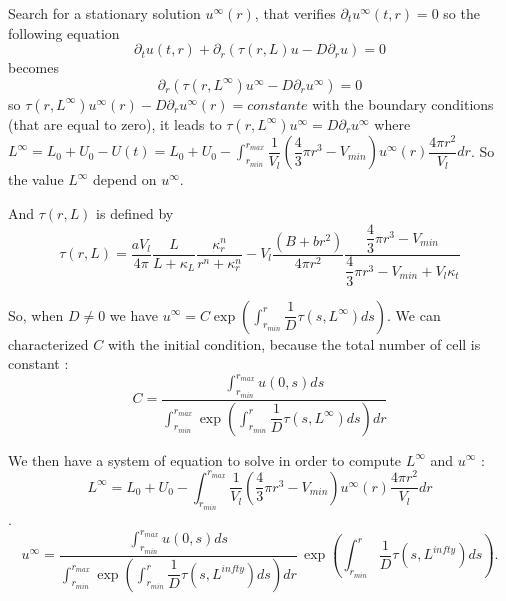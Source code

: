 \documentclass[11pt,a4paper]{article}
\begin{document}
Search for a stationary solution $u^{\infty}(r)$, that verifies $\partial_t u^{\infty}(t, r) = 0$ so the following equation
$$\partial_t u(t, r) + \partial_r( \tau(r, L) u - D \partial_r u) = 0$$
becomes 
$$\partial_r( \tau(r, L^{\infty}) u^{\infty} - D \partial_r u^{\infty}) = 0$$
so $\tau(r, L^{\infty}) u^{\infty}(r) - D \partial_r u^{\infty}(r) = constante$
with the boundary conditions (that are equal to zero), it leads to $\tau(r, L^{\infty}) u^{\infty} = D \partial_r u^{\infty}$
where $L^{\infty} = L_0 + U_0 - U(t) = L_0 + U_0 - \int_{r_{min}}^{r_{max}} \dfrac{1}{V_l}(\dfrac{4}{3} \pi r^3 - V_{min})u^{\infty}(r) \dfrac{4\pi r^ 2}{V_l} dr$.
So the value $L^{\infty}$ depend on $u^{\infty}$.

And $\tau(r, L)$ is defined by 
$$ \tau(r, L) = \dfrac{aV_l}{4\pi}  \dfrac{L}{L + \kappa_L} \dfrac{\kappa_r^n}{r^n+\kappa_r^n} - V_l \dfrac{(B + br^2)}{4\pi r^2} \dfrac{\dfrac{4}{3} \pi r^3 - V_{min}}{\dfrac{4}{3} \pi r^3 - V_{min} + V_l\kappa_t}$$

So, when $D \neq 0$ we have $u^{\infty} = \displaystyle C \exp \left( \int_{r_{min}}^{r} \dfrac{1}{D} \tau(s, L^{\infty}) ds \right)$.
We can characterized $C$ with the initial condition, because the total number of cell is constant : 
$$ C = \displaystyle \dfrac{ \int_{r_{min}}^{r_{max}} u(0,s) ds}{\int_{r_{min}}^{r_{max}} \exp  \left( \int_{r_{min}}^{r} \dfrac{1}{D} \tau(s, L^{\infty}) ds \right) dr}$$

We then have a system of equation to solve in order to compute $L^{\infty}$ and $u^{\infty}$ : 
$$L^{\infty} = L_0 + U_0 - \int_{r_{min}}^{r_{max}} \dfrac{1}{V_l}(\dfrac{4}{3} \pi r^3 - V_{min})u^{\infty}(r) \dfrac{4\pi r^ 2}{V_l} dr$$.
$$u^{\infty} = \displaystyle \dfrac{ \int_{r_{min}}^{r_{max}} u(0,s) ds}{\int_{r_{min}}^{r_{max}} \exp  \left( \int_{r_{min}}^{r} \dfrac{1}{D} \tau(s, L^{infty}) ds \right) dr}  \, \exp \left( \int_{r_{min}}^{r} \dfrac{1}{D} \tau(s, L^{infty}) ds \right).$$
\end{document}
